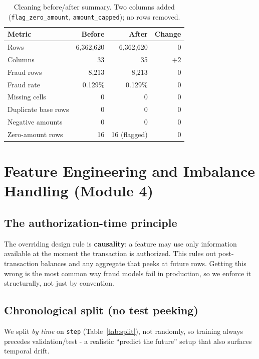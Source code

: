\documentclass[11pt,a4paper]{report}
\newcommand{\code}[1]{\texttt{\small #1}}
\begin{document}
\begin{table}[h]
\centering
\small
\begin{tabular}{@{}lrrr@{}}
\toprule
\textbf{Metric} & \textbf{Before} & \textbf{After} & \textbf{Change}\\
\midrule
Rows & 6{,}362{,}620 & 6{,}362{,}620 & 0\\
Columns & 33 & 35 & $+2$\\
Fraud rows & 8{,}213 & 8{,}213 & 0\\
Fraud rate & 0.129\% & 0.129\% & 0\\
Missing cells & 0 & 0 & 0\\
Duplicate base rows & 0 & 0 & 0\\
Negative amounts & 0 & 0 & 0\\
Zero-amount rows & 16 & 16 (flagged) & 0\\
\bottomrule
\end{tabular}
\caption{Cleaning before/after summary. Two columns added
(\code{flag\_zero\_amount}, \code{amount\_capped}); no rows removed.}
\label{tab:cleanba}
\end{table}

\chapter{Feature Engineering and Imbalance Handling (Module 4)}
\label{ch:m4}

\section{The authorization-time principle}

The overriding design rule is \textbf{causality}: a feature may use only information
available at the moment the transaction is authorized. This rules out post-transaction
balances and any aggregate that peeks at future rows. Getting this wrong is the most common
way fraud models fail in production, so we enforce it structurally, not just by convention.

\section{Chronological split (no test peeking)}

We split \emph{by time} on \code{step} (Table~\ref{tab:split}), not randomly, so training
always precedes validation/test - a realistic ``predict the future'' setup that also
surfaces temporal drift.
\end{document}
